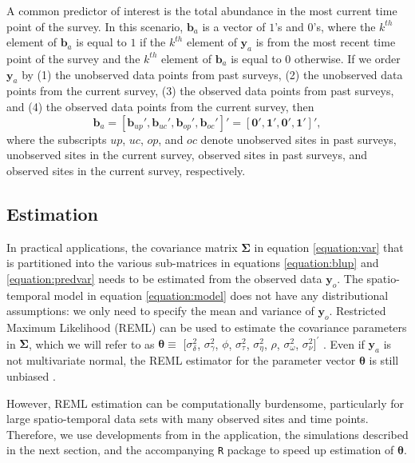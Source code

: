\documentclass[]{interact}
\theoremstyle{plain}%
\theoremstyle{definition}
\theoremstyle{remark}
\begin{document}
A common predictor of interest is the total abundance in the most
current time point of the survey. In this scenario, \(\mathbf{b}_a\) is
a vector of \(1\)'s and \(0\)'s, where the \(k^{th}\) element of
\(\mathbf{b}_a\) is equal to \(1\) if the \(k^{th}\) element of
\(\mathbf{y}_a\) is from the most recent time point of the survey and
the \(k^{th}\) element of \(\mathbf{b}_a\) is equal to 0 otherwise. If
we order \(\mathbf{y}_a\) by (1) the unobserved data points from past
surveys, (2) the unobserved data points from the current survey, (3) the
observed data points from past surveys, and (4) the observed data points
from the current survey, then \mbox{}
\begin{equation} \label{equation:currentweights}
\mathbf{b}_a = [\mathbf{b}_{up}', \mathbf{b}_{uc}', \mathbf{b}_{op}', \mathbf{b}_{oc}']' = [\mathbf{0}', \mathbf{1}', \mathbf{0}', \mathbf{1}']',
\end{equation} \noindent where the subscripts \(up\), \(uc\), \(op\),
and \(oc\) denote unobserved sites in past surveys, unobserved sites in
the current survey, observed sites in past surveys, and observed sites
in the current survey, respectively.

\subsection{Estimation}

In practical applications, the covariance matrix \(\bm{\Sigma}\) in
equation \ref{equation:var} that is partitioned into the various
sub-matrices in equations \ref{equation:blup} and \ref{equation:predvar}
needs to be estimated from the observed data \(\mathbf{y}_o\). The
spatio-temporal model in equation \ref{equation:model} does not have any
distributional assumptions: we only need to specify the mean and
variance of \(\mathbf{y}_o\). Restricted Maximum Likelihood (REML) can
be used to estimate the covariance parameters in \(\bm{\Sigma}\), which
we will refer to as \(\bm{\theta} \equiv\) \([\sigma^2_{\delta}\),
\(\sigma^2_{\gamma}\), \(\phi\), \(\sigma^2_{\tau}\),
\(\sigma^2_{\eta}\), \(\rho\), \(\sigma^2_{\omega}\),
\(\sigma^2_{\nu}]^\prime\)
\citep{patterson1971recovery, harville1977maximum}. Even if
\(\mathbf{y}_a\) is not multivariate normal, the REML estimator for the
parameter vector \(\bm{\theta}\) is still unbiased
\citep{heyde1994quasi, cressie1993asymptotic}.

However, REML estimation can be computationally burdensome, particularly
for large spatio-temporal data sets with many observed sites and time
points. Therefore, we use developments from \citet{dumelle2021linear} in
the application, the simulations described in the next section, and the
accompanying \texttt{R} package to speed up estimation of
\(\bm{\theta}\).
\end{document}
